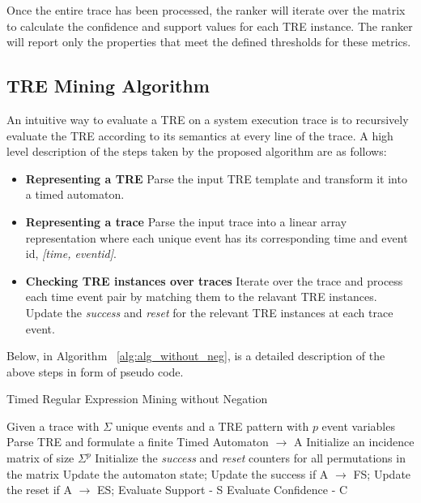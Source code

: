 \documentclass[]{sigplanconf}
\begin{document}
Once the entire trace has been processed, the ranker will iterate over the matrix to calculate the confidence and support values for each TRE instance. The ranker will report only the properties that meet the defined thresholds for these metrics.

\subsection{TRE Mining Algorithm}

An intuitive way to evaluate a TRE on a system execution trace is to recursively evaluate the TRE according to its semantics at every line of the trace. A high level description of the steps taken by the proposed algorithm are as follows:

\begin{itemize}
\item \textbf{Representing a TRE} Parse the input TRE template and transform it into a timed automaton.
\item \textbf{Representing a trace} Parse the input trace into a linear array representation where each unique event has its corresponding time and event id, \emph{[time, eventid]}.
\item \textbf{Checking TRE instances over traces} Iterate over the trace and process each time event pair by matching them to the relavant TRE instances. Update the \emph{success} and \emph{reset} for the relevant TRE instances at each trace event.
\end{itemize}

Below, in Algorithm ~\ref{alg:alg_without_neg}, is a detailed description of the above steps in form of pseudo code.

\begin{algorithm}[h]
    \caption{Timed Regular Expression Mining without Negation}
    \begin{algorithmic}[1]
     \Require  Given a trace with $\Sigma$ unique events and a TRE pattern with $p$ event variables
     \Ensure Parse TRE and formulate a finite Timed Automaton $\rightarrow$ A
     \State Initialize an incidence matrix of size $\Sigma^p$
     \State Initialize the \emph{success} and \emph{reset} counters for all permutations in the matrix
        \State Update the automaton state;
        \State Update the success if A $\rightarrow$ FS;
        \State Update the reset if A $\rightarrow$ ES;
     \EndFor
     \EndFor
     \State Evaluate Support - S
     \State Evaluate Confidence - C
    \end{algorithmic}
\label{alg:alg_without_neg}
\end{algorithm}
\end{document}
